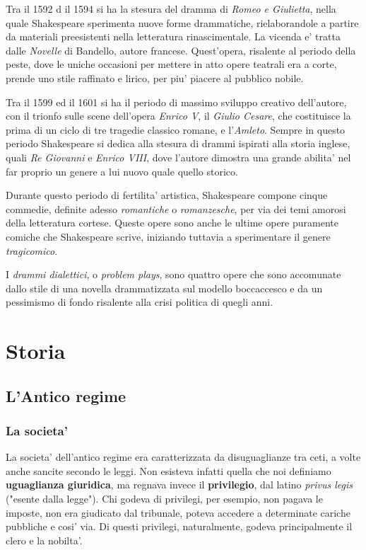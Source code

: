 \documentclass{article}
\begin{document}
{{    Tra il 1592 d il 1594 si ha la stesura del dramma di \textit{Romeo e Giulietta}, nella quale Shakespeare sperimenta nuove forme drammatiche, rielaborandole a partire da materiali preesistenti nella letteratura rinascimentale. La vicenda e' tratta dalle \textit{Novelle} di Bandello, autore francese. Quest'opera, risalente al periodo della peste, dove le uniche occasioni per mettere in atto opere teatrali era a corte, prende uno stile raffinato e lirico, per piu' piacere al pubblico nobile.

    Tra il 1599 ed il 1601 si ha il periodo di massimo sviluppo creativo dell'autore, con il trionfo sulle scene dell'opera \textit{Enrico V}, il \textit{Giulio Cesare}, che costituisce la prima di un ciclo di tre tragedie classico romane, e l'\textit{Amleto}. Sempre in questo periodo Shakespeare si dedica alla stesura di drammi ispirati alla storia inglese, quali \textit{Re Giovanni} e \textit{Enrico VIII}, dove l'autore dimostra una grande abilita' nel far proprio un genere a lui nuovo quale quello storico.

    Durante questo periodo di fertilita' artistica, Shakespeare compone cinque commedie, definite adesso \textit{romantiche} o \textit{romanzesche}, per via dei temi amorosi della letteratura cortese. Queste opere sono anche le ultime opere puramente comiche che Shakespeare scrive, iniziando tuttavia a sperimentare il genere \textit{tragicomico}.

    I \textit{drammi dialettici}, o \textit{problem plays}, sono quattro opere che sono accomunate dallo stile di una novella drammatizzata sul modello boccaccesco e da un pessimismo di fondo risalente alla crisi politica di quegli anni.
  }

  \pagebreak
  \section{Storia}
  {
    \subsection{L'Antico regime}
    \subsubsection{La societa'}
    La societa' dell'antico regime era caratterizzata da disuguaglianze tra ceti, a volte anche sancite secondo le leggi. Non esisteva infatti quella che noi definiamo \textbf{uguaglianza giuridica}, ma regnava invece il \textbf{privilegio}, dal latino \textit{privus legis} \small{("esente dalla legge")}. Chi godeva di privilegi, per esempio, non pagava le imposte, non era giudicato dal tribunale, poteva accedere a determinate cariche pubbliche e cosi' via. Di questi privilegi, naturalmente, godeva principalmente il clero e la nobilta'.

}}
\end{document}

